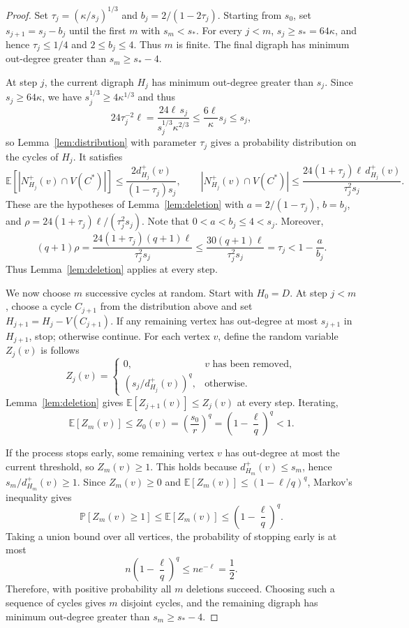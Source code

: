 \documentclass[10pt,a4paper]{article}
\numberwithin{equation}{section}
\newcommand{\jbjcomment}[1]{\textcolor{blue}{JBJ: #1}}
\begin{document}
\begin{proof}
Set $\tau_j=(\kappa/s_j)^{1/3}$ and $b_j=2/(1-2\tau_j)$.
Starting from $s_0$, set $s_{j+1}=s_j-b_j$ until the first $m$ with
$s_m<s_\ast$. For every $j<m$, $s_j\ge s_\ast=64\kappa$, and hence
$\tau_j\le1/4$ and $2\le b_j\le4$. Thus $m$ is finite. The final digraph
has minimum out-degree greater than $s_m\ge s_\ast-4$.

At step $j$, the current digraph $H_j$ has minimum out-degree greater than
$s_j$. Since $s_j\ge64\kappa$, we have $s_j^{1/3}\ge4\kappa^{1/3}$ and
thus
$$
24\tau_j^{-2}\ell
=\frac{24\ell\,s_j}{s_j^{1/3}\kappa^{2/3}}
\le\frac{6\ell}{\kappa}s_j\le s_j,
$$
so Lemma~\ref{lem:distribution} with parameter $\tau_j$ gives a probability distribution on the cycles of $H_j$. It satisfies
$$
\mathbb E[|N_{H_j}^+(v)\cap V(C^\ast)|]
\le\frac{2d_{H_j}^+(v)}{(1-\tau_j)s_j},
\qquad
|N_{H_j}^+(v)\cap V(C^\ast)|
\le\frac{24(1+\tau_j)\ell\,d_{H_j}^+(v)}{\tau_j^2s_j}.
$$
These are the hypotheses of Lemma~\ref{lem:deletion} with
$a=2/(1-\tau_j)$, $b=b_j$, and
$\rho=24(1+\tau_j)\ell/(\tau_j^2s_j)$. Note that
$0<a<b_j\le4<s_j$. Moreover,
$$
(q+1)\rho =\frac{24(1+\tau_j)(q+1)\ell}{\tau_j^2s_j}\le\frac{30(q+1)\ell}{\tau_j^2s_j}=\tau_j
<1-\frac{a}{b_j}.
$$
Thus Lemma~\ref{lem:deletion} applies at every step.



We now choose $m$ successive cycles at random. Start with $H_0=D$. At
step $j<m$, choose a cycle $C_{j+1}$ from the distribution above and set
$H_{j+1}=H_j-V(C_{j+1})$. If any remaining vertex has out-degree at most
$s_{j+1}$ in $H_{j+1}$, stop; otherwise continue.
For each vertex $v$, define the random variable $Z_j(v)$ is follows 
$$
Z_j(v)=
\begin{cases}
0,&v\text{ has been removed},\\
(s_j/d_{H_j}^+(v))^q,&\text{otherwise}.
\end{cases}
$$
Lemma~\ref{lem:deletion} gives $\mathbb E[Z_{j+1}(v)]\le Z_j(v)$ at
every step. Iterating,
$$
\mathbb E[Z_m(v)]\le Z_0(v)=\left(\frac{s_0}{r}\right)^q
=\left(1-\frac{\ell}{q}\right)^q<1.
$$

If the process stops early, some remaining vertex $v$ has out-degree at
most the current threshold, so $Z_m(v)\ge1$.  This holds because $d_{H_m}^+(v)\le s_m$, hence $s_m/d_{H_m}^+(v)\ge1$.  Since $Z_m(v)\ge0$ and
$\mathbb E[Z_m(v)]\le(1-\ell/q)^q$, Markov's inequality gives
$$
\mathbb P[Z_m(v)\ge1]\le\mathbb E[Z_m(v)]\le\left(1-\frac{\ell}{q}\right)^q.
$$
Taking a union bound over all vertices, the probability of stopping early
is at most
$$
n\left(1-\frac{\ell}{q}\right)^q\le ne^{-\ell}=\frac12.
$$
Therefore, with positive probability all $m$ deletions succeed. Choosing
such a sequence of cycles gives $m$ disjoint cycles, and the remaining
digraph has minimum out-degree greater than $s_m\ge s_\ast-4$.


\end{proof}
\end{document}
